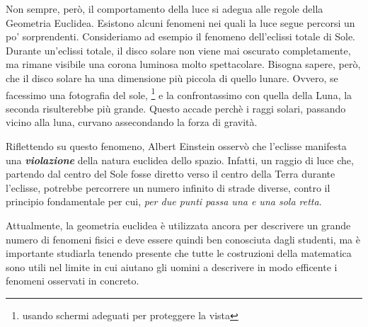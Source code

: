 Non sempre, però, il comportamento della luce si adegua alle regole della Geometria Euclidea. Esistono alcuni fenomeni nei quali la luce segue percorsi un po' sorprendenti. Consideriamo ad esempio il fenomeno dell'eclissi totale di Sole.
\newline
Durante un'eclissi totale, il disco solare non viene mai oscurato completamente, ma rimane visibile una corona luminosa molto spettacolare. Bisogna sapere, però, che il disco solare ha una dimensione più piccola di quello lunare. Ovvero, se facessimo una fotografia del sole, \footnote {usando schermi adeguati per proteggere la vista} e la confrontassimo con quella della Luna, la seconda risulterebbe più grande. Questo accade perchè i raggi solari, passando vicino alla luna, curvano assecondando la forza di gravità.
\newline

Riflettendo su questo fenomeno, Albert Einstein osservò che l'eclisse manifesta una {\bfseries {\slshape violazione}} della natura euclidea dello spazio. Infatti, un raggio di luce che, partendo dal centro del Sole fosse diretto verso il centro della Terra durante l'eclisse, potrebbe percorrere un numero infinito di strade diverse, contro il principio fondamentale per cui, {\slshape per due punti passa una e una sola retta}. 
\newline

Attualmente, la geometria euclidea è utilizzata ancora per descrivere un grande numero di fenomeni fisici e deve essere quindi ben conosciuta dagli studenti, ma è importante studiarla tenendo presente che tutte le costruzioni della matematica sono utili nel limite in cui aiutano gli uomini a descrivere in modo efficente i fenomeni osservati in concreto.
